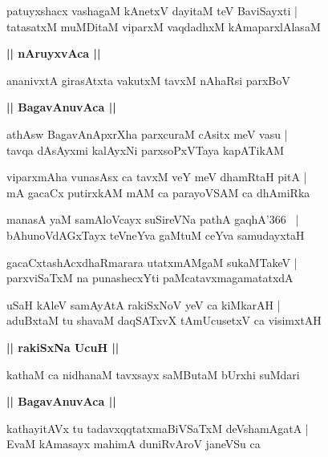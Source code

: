 \documentclass[twoside,12pt,openright]{book}
\newcounter{shloka}[chapter]
\def\uvaca#1{\centerline{{\large\textbf{#1}}}}
\begin{document}
\begin{shloka}%
patuyxshacx vashagaM kAnetxV dayitaM teV BaviSayxti |\\
tatasatxM muMDitaM viparxM vaqdadhxM kAmaparxlAlasaM 
\end{shloka}

\uvaca{|| nAruyxvAca ||}

\begin{shloka}%
ananivxtA girasAtxta vakutxM tavxM nAhaRsi parxBoV 
\end{shloka}

\uvaca{|| BagavAnuvAca ||}

\begin{shloka}%
athAsw BagavAnApxrXha parxcuraM cAsitx meV vasu |\\
tavqa dAsAyxmi kalAyxNi parxsoPxVTaya kapATikAM 
\end{shloka}

\begin{shloka}%
viparxmAha vunasAsx ca tavxM veY meV dhamRtaH pitA |\\
mA gacaCx putirxkAM mAM ca parayoVSAM ca dhAmiRka 
\end{shloka}

\begin{shloka}%
manasA yaM samAloVcayx suSireVNa pathA gaqhA\char'366 ~|\\
bAhunoVdAGxTayx teVneYva gaMtuM ceYva samudayxtaH 
\end{shloka}

\begin{shloka}%
gacaCxtashAcxdhaRmarara utatxmAMgaM sukaMTakeV |\\
parxviSaTxM na punashecxYti paMcatavxmagamatatxdA
\end{shloka}

\begin{shloka}%
uSaH kAleV samAyAtA rakiSxNoV yeV ca kiMkarAH |\\
aduBxtaM tu shavaM daqSATxvX tAmUcusetxV ca visimxtAH 
\end{shloka}

\uvaca{|| rakiSxNa UcuH ||}

\begin{shloka}%
kathaM ca nidhanaM tavxsayx saMButaM bUrxhi suMdari 
\end{shloka}

\uvaca{|| BagavAnuvAca ||}

\begin{shloka}%
kathayitAVx tu tadavxqqtatxmaBiVSaTxM deVshamAgatA |\\
EvaM kAmasayx mahimA duniRvAroV janeVSu ca 
\end{shloka}
\end{document}
